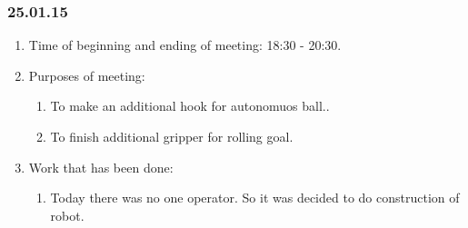 \subsubsection{25.01.15}
\begin{enumerate}
	
	\item Time of beginning and ending of meeting: 18:30 - 20:30.
	
	\item Purposes of meeting: 
	\begin{enumerate}
		
		\item To make an additional hook for autonomuos ball..
		
		\item To finish additional gripper for rolling goal.
		
	\end{enumerate}

	\item Work that has been done:
	\begin{enumerate}
		
		\item Today there was no one operator. So it was decided to do construction of robot.
		

\end{enumerate}
\end{enumerate}
